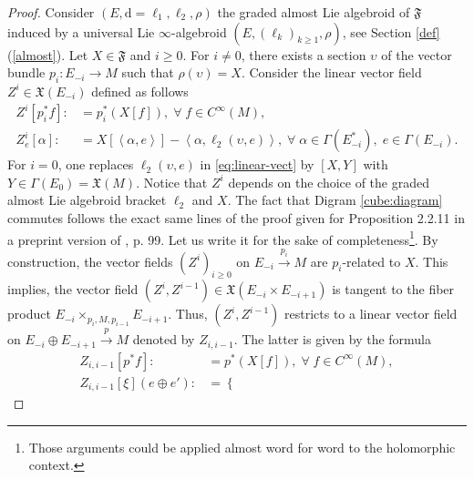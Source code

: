 \documentclass[10pt]{article}
\theoremstyle{plain}
\theoremstyle{definition}
\theoremstyle{remark}
\newcommand{\dd}{\mathrm{d}}
\begin{document}
 \begin{proof}Consider $(E, \dd=\ell_1, \ell_2, \rho)$ the graded almost  Lie algebroid of $\mathfrak{F}$ induced by a universal Lie $\infty$-algebroid $(E, (\ell_k)_{k\geq 1},\rho)$, see Section \ref{def}(\ref{almost}).  Let $X\in \mathfrak{F}$ and $i\geq 0$. For $i\neq 0$, there exists a section $\upsilon$ of the vector bundle $p_i\colon E_{-i}\rightarrow M$ such that $\rho(\upsilon)=X$. Consider the linear vector field $Z^i\in \mathfrak{X}(E_{-i})$ defined as follows
 \begin{align}
    Z^i[p_i^*f]:&=p_i^*(X[f]),\;\forall\; f\in C^\infty(M),\\\label{eq:linear-vect}Z^i_e[\alpha]:&=X[\left\langle \alpha ,e\right\rangle]-\left\langle \alpha, \ell_{2}(\upsilon,e)\right\rangle,\;\forall\; \alpha\in \Gamma(E^*_{-i}),\;e\in\Gamma(E_{-i}).
 \end{align}
For $i=0$, one replaces $\ell_2(\upsilon, e)$ in \eqref{eq:linear-vect} by $[X, Y]$ with $Y\in \Gamma(E_0)=\mathfrak{X}(M)$.
Notice that $Z^i$ depends on the choice of the graded almost  Lie algebroid bracket $\ell_2$ and $X$. The fact that  Digram \eqref{cube:diagram} commutes follows the exact same lines of the proof given for Proposition 2.2.11 in a preprint version of \cite{LLL}, p. 99. Let us write it for the sake of completeness\footnote{Those arguments could be applied almost word for word to the holomorphic context.}. %
By construction, the vector fields $(Z^i)_{i\geq 0}$  on  $E_{-i} \stackrel{p_i}{\to} M$  are $p_i$-related to $X$. This implies,  the vector field $(Z^{i},Z^{i-1})\in \mathfrak X (E_{-i} \times E_{-i+1}) $ is tangent to the fiber product $E_{-i} \times_{p_i,M,p_{i-1}} E_{-i+1} $. Thus, $(Z^{i},Z^{i-1})$ restricts to a linear vector field on $E_{-i} \oplus E_{-i+1} \stackrel{p}{\to} M$  denoted by $Z_{i,i-1}$. The latter is given by the formula \begin{align*}
    Z_{i,i-1}[p^*f]:&=p^*(X[f]),\;\forall\; f\in C^\infty(M),\\\label{eq:linear-vect}Z_{i,i-1}[\xi](e\oplus e'):&=\begin{cases}

\end{cases}
\end{align*}
\end{proof}
\end{document}
